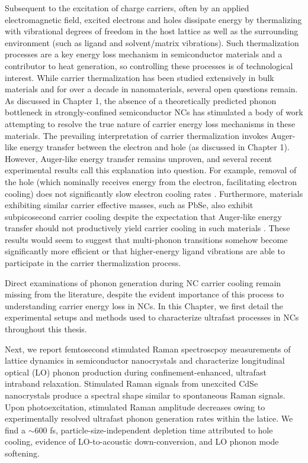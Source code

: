 Subsequent to the excitation of charge carriers, often by an applied electromagnetic field, excited electrons and holes dissipate energy by thermalizing with vibrational degrees of freedom in the host lattice as well as the surrounding environment (such as ligand and solvent/matrix vibrations). Such thermalization processes are a key energy loss mechanism in semiconductor materials and a contributor to heat generation, so controlling these processes is of technological interest. While carrier thermalization has been studied extensively in bulk materials and for over a decade in nanomaterials, several open questions remain. As discussed in Chapter 1, the absence of a theoretically predicted phonon bottleneck in strongly-confined semiconductor NCs has stimulated a body of work attempting to resolve the true nature of carrier energy loss mechanisms in these materials. The prevailing interpretation of carrier thermalization invokes Auger-like energy transfer between the electron and hole (as discussed in Chapter 1). However, Auger-like energy transfer remains unproven, and several recent experimental results call this explanation into question. For example, removal of the hole (which nominally receives energy from the electron, facilitating electron cooling) does not significantly slow electron cooling rates \cite{PhysRevB.60.R2181, klimov2000mechanisms}. Furthermore, materials exhibiting similar carrier effective masses, such as PbSe, also exhibit subpicosecond carrier cooling despite the expectation that Auger-like energy transfer should not productively yield carrier cooling in such materials \cite{wehrenberg2002interband, harbold2005time}. These results would seem to suggest that multi-phonon transitions somehow become significantly more efficient or that higher-energy ligand vibrations are able to participate in the carrier thermalization process. \par

Direct examinations of phonon generation during NC carrier cooling remain missing from the literature, despite the evident importance of this process to understanding carrier energy loss in NCs. In this Chapter, we first detail the experimental setups and methods used to characterize ultrafast processes in NCs throughout this thesis. \par

Next, we report femtosecond stimulated Raman spectroscpoy measurements of lattice dynamics in semiconductor nanocrystals and characterize longitudinal optical (LO) phonon production during confinement-enhanced, ultrafast intraband relaxation. Stimulated Raman signals from unexcited CdSe nanocrystals produce a spectral shape similar to spontaneous Raman signals. Upon photoexcitation, stimulated Raman amplitude decreases owing to experimentally resolved ultrafast phonon generation rates within the latice. We find a $\sim$600 fs, particle-size-independent depletion time attributed to hole cooling, evidence of LO-to-acoustic down-conversion, and LO phonon mode softening. \par

